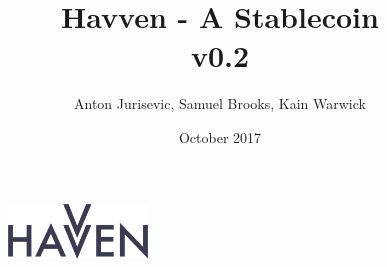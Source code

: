 \documentclass{article}
\begin{document}
\newcommand{\CUR}{\textsc{cur}}
\newcommand{\NOM}{\textsc{nom}}


\title{Havven - A Stablecoin \\ v0.2}
\author{Anton Jurisevic, Samuel Brooks, Kain Warwick}
\date{October 2017}


\begin{figure}
    \centering
    \includegraphics[width=0.33\textwidth]{img/havvenlogo}
\end{figure}
\maketitle










\end{document}
